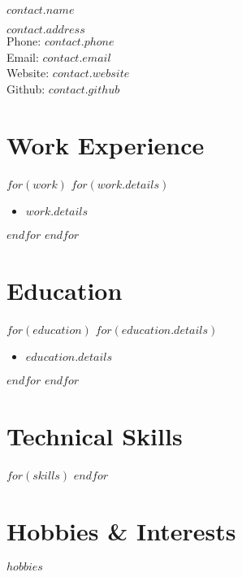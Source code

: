 \documentclass{cv-class}
\begin{document}
{\LARGE $contact.name$}\\
\smallskip

$contact.address$\\
Phone: $contact.phone$\\
Email: $contact.email$\\
Website: $contact.website$\\
Github: $contact.github$

\section*{Work Experience}
$for(work)$
$for(work.details)$
\begin{itemize}
  \item $work.details$
\end{itemize}
$endfor$
$endfor$

\section*{Education}
$for(education)$
$for(education.details)$
\begin{itemize}
  \item $education.details$
\end{itemize}
$endfor$
$endfor$

\section*{Technical Skills}
$for(skills)$
$endfor$

\section*{Hobbies \& Interests}
$hobbies$
\end{document}
